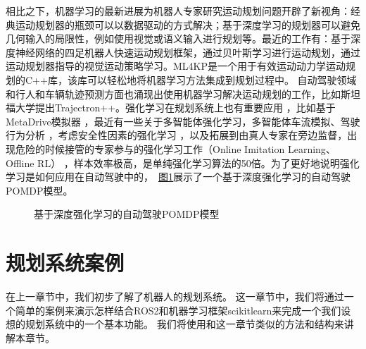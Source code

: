 \documentclass[letterpaper,10pt,english]{sphinxmanual}
\let\sphinxpxdimen\pdfpxdimen\else\newdimen\sphinxpxdimen
\begin{document}
\sphinxAtStartPar
相比之下，机器学习的最新进展为机器人专家研究运动规划问题开辟了新视角：经典运动规划器的瓶颈可以以数据驱动的方式解决；基于深度学习的规划器可以避免几何输入的局限性，例如使用视觉或语义输入进行规划等。最近的工作有：基于深度神经网络的四足机器人快速运动规划框架，通过贝叶斯学习进行运动规划，通过运动规划器指导的视觉运动策略学习。ML4KP是一个用于有效运动动力学运动规划的C++库，该库可以轻松地将机器学习方法集成到规划过程中。
自动驾驶领域和行人和车辆轨迹预测方面也涌现出使用机器学习解决运动规划的工作，比如斯坦福大学提出Trajectron++。强化学习在规划系统上也有重要应用
，比如基于MetaDrive模拟器
，最近有一些关于多智能体强化学习，多智能体车流模拟、驾驶行为分析
，考虑安全性因素的强化学习
，以及拓展到由真人专家在旁边监督，出现危险的时候接管的专家参与的强化学习工作（Online
Imitation Learning、Offline RL）
，样本效率极高，是单纯强化学习算法的50倍。为了更好地说明强化学习是如何应用在自动驾驶中的， \hyperref[\detokenize{chapter_rl_sys/planning:rl-ad}]{图\ref{\detokenize{chapter_rl_sys/planning:rl-ad}}}展示了一个基于深度强化学习的自动驾驶POMDP模型。

\begin{figure}[H]
\centering
\capstart

\noindent\sphinxincludegraphics[width=800\sphinxpxdimen]{{rl_ad}.png}
\caption{基于深度强化学习的自动驾驶POMDP模型 }\label{\detokenize{chapter_rl_sys/planning:id9}}\label{\detokenize{chapter_rl_sys/planning:rl-ad}}\end{figure}


\section{规划系统案例}
\label{\detokenize{chapter_rl_sys/planning_code_ex:id1}}\label{\detokenize{chapter_rl_sys/planning_code_ex::doc}}
\sphinxAtStartPar
在上一章节中，我们初步了解了机器人的规划系统。
这一章节中，我们将通过一个简单的案例来演示怎样结合ROS2和机器学习框架scikit\sphinxhyphen{}learn来完成一个我们设想的规划系统中的一个基本功能。
我们将使用和这一章节类似的方法和结构来讲解本章节。
\end{document}
